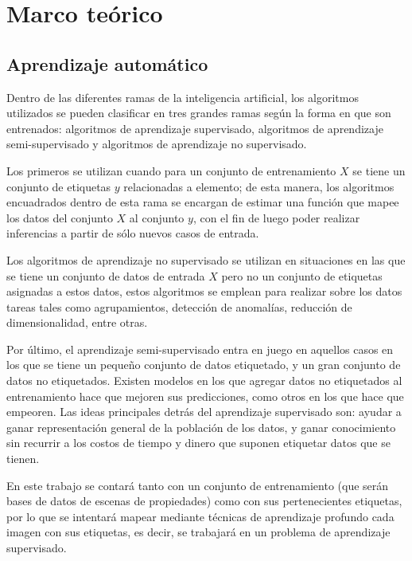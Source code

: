 \section{Marco teórico}
\subsection{Aprendizaje automático}
 Dentro de las diferentes ramas de la inteligencia artificial, los algoritmos utilizados se pueden clasificar en tres grandes ramas según la forma en que son entrenados: algoritmos de aprendizaje supervisado, algoritmos de aprendizaje semi-supervisado y algoritmos de aprendizaje no supervisado.
 
  Los primeros se utilizan cuando para un conjunto de entrenamiento \(X\) se tiene un conjunto de etiquetas \(y\) relacionadas a elemento; de esta manera, los algoritmos encuadrados dentro de esta rama se encargan de estimar una función que mapee los datos del conjunto \(X\) al conjunto \(y\), con el fin de luego poder realizar inferencias a partir de sólo nuevos casos de entrada.
 
  Los algoritmos de aprendizaje no supervisado se utilizan en situaciones en las que se tiene un conjunto de datos de entrada \(X\) pero no un conjunto de etiquetas asignadas a estos datos, estos algoritmos se emplean para realizar sobre los datos tareas tales como agrupamientos, detección de anomalías, reducción de dimensionalidad, entre otras.
  
  Por último, el aprendizaje semi-supervisado entra en juego en aquellos casos en los que se tiene un pequeño conjunto de datos etiquetado, y un gran conjunto de datos no etiquetados. Existen modelos en los que agregar datos no etiquetados al entrenamiento hace que mejoren sus predicciones, como otros en los que hace que empeoren. Las ideas principales detrás del aprendizaje supervisado son: ayudar a ganar representación general de la población de los datos, y ganar conocimiento sin recurrir a los costos de tiempo y dinero que suponen etiquetar datos que se tienen.
 
 En este trabajo se contará tanto con un conjunto de entrenamiento (que serán bases de datos de escenas de propiedades) como con sus pertenecientes etiquetas, por lo que se intentará mapear mediante técnicas de aprendizaje profundo cada imagen con sus etiquetas, es decir, se trabajará en un problema de aprendizaje supervisado.
 
